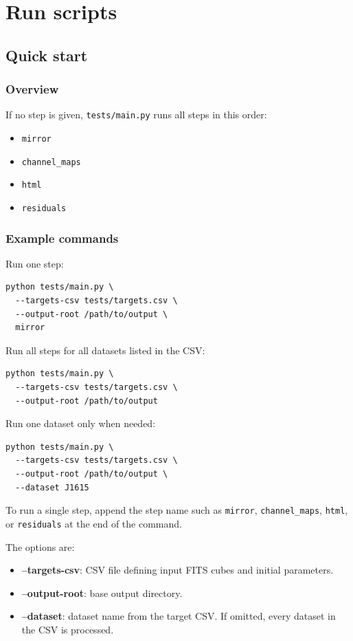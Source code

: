\documentclass{report}
\begin{document}
\chapter{Run scripts \label{sec:run_script}}
\section{Quick start}
\subsection{Overview}
If no step is given, \texttt{tests/main.py} runs all steps in this order:
\begin{itemize}
    \item \texttt{mirror}
    \item \texttt{channel\_maps}
    \item \texttt{html}
    \item \texttt{residuals}
\end{itemize}

\subsection{Example commands}
Run one step:
\begin{verbatim}
python tests/main.py \
  --targets-csv tests/targets.csv \
  --output-root /path/to/output \
  mirror
\end{verbatim}

Run all steps for all datasets listed in the CSV:
\begin{verbatim}
python tests/main.py \
  --targets-csv tests/targets.csv \
  --output-root /path/to/output
\end{verbatim}

Run one dataset only when needed:
\begin{verbatim}
python tests/main.py \
  --targets-csv tests/targets.csv \
  --output-root /path/to/output \
  --dataset J1615
\end{verbatim}

To run a single step, append the step name such as \texttt{mirror}, \texttt{channel\_maps}, \texttt{html}, or \texttt{residuals} at the end of the command.

The options are:
\begin{itemize}
    \item \textbf{--targets-csv}: CSV file defining input FITS cubes and initial parameters.
    \item \textbf{--output-root}: base output directory.
    \item \textbf{--dataset}: dataset name from the target CSV. If omitted, every dataset in the CSV is processed.
\end{itemize}
\end{document}
